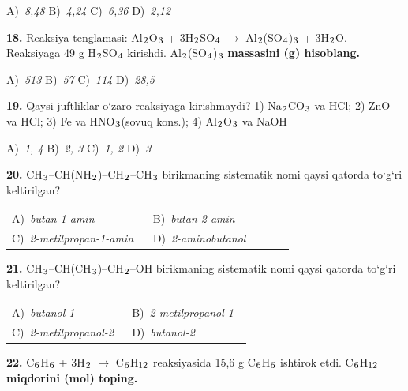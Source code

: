 \documentclass[11pt,a4paper]{article}
\renewcommand{\textsubscript}[1]{\ensuremath{_{\text{\fontsize{8}{8}\selectfont #1}}}}
\begin{document}
\begin{multicols}{2}
\noindent A)~\textsl{8,48} \hfill B)~\textsl{4,24} \hfill C)~\textsl{6,36} \hfill D)~\textsl{2,12}\par
\vspace{4pt}
\noindent\textbf{18.} Reaksiya tenglamasi: Al\textsubscript{2}O\textsubscript{3} + 3H\textsubscript{2}SO\textsubscript{4} $\to$ Al\textsubscript{2}(SO\textsubscript{4})\textsubscript{3} + 3H\textsubscript{2}O. Reaksiyaga 49 g H\textsubscript{2}SO\textsubscript{4} kirishdi. Al\textsubscript{2}(SO\textsubscript{4})\textsubscript{3} \textbf{massasini (g) hisoblang.}

\noindent A)~\textsl{513} \hfill B)~\textsl{57} \hfill C)~\textsl{114} \hfill D)~\textsl{28,5}\par
\vspace{4pt}
\noindent\textbf{19.} Qaysi juftliklar o`zaro reaksiyaga kirishmaydi? 1) Na\textsubscript{2}CO\textsubscript{3} va HCl; 2) ZnO va HCl; 3) Fe va HNO\textsubscript{3}(sovuq kons.); 4) Al\textsubscript{2}O\textsubscript{3} va NaOH

\noindent A)~\textsl{1, 4} \hfill B)~\textsl{2, 3} \hfill C)~\textsl{1, 2} \hfill D)~\textsl{3}\par
\vspace{4pt}
\noindent\textbf{20.} CH\textsubscript{3}--CH(NH\textsubscript{2})--CH\textsubscript{2}--CH\textsubscript{3} birikmaning sistematik nomi qaysi qatorda to`g`ri keltirilgan?

\noindent\begin{tabular}{@{}p{0.47\linewidth}@{}p{0.47\linewidth}@{}}
A)~\textsl{butan-1-amin} & B)~\textsl{butan-2-amin} \\
C)~\textsl{2-metilpropan-1-amin} & D)~\textsl{2-aminobutanol} \\
\end{tabular}\par
\vspace{4pt}
\noindent\textbf{21.} CH\textsubscript{3}--CH(CH\textsubscript{3})--CH\textsubscript{2}--OH birikmaning sistematik nomi qaysi qatorda to`g`ri keltirilgan?

\noindent\begin{tabular}{@{}p{0.47\linewidth}@{}p{0.47\linewidth}@{}}
A)~\textsl{butanol-1} & B)~\textsl{2-metilpropanol-1} \\
C)~\textsl{2-metilpropanol-2} & D)~\textsl{butanol-2} \\
\end{tabular}\par
\vspace{4pt}
\noindent\textbf{22.} C\textsubscript{6}H\textsubscript{6} + 3H\textsubscript{2} $\to$ C\textsubscript{6}H\textsubscript{12} reaksiyasida 15,6 g C\textsubscript{6}H\textsubscript{6} ishtirok etdi. C\textsubscript{6}H\textsubscript{12} \textbf{miqdorini (mol) toping.}


\end{multicols}
\end{document}
